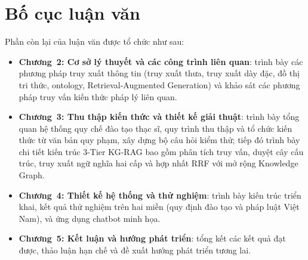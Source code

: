 \section{Bố cục luận văn}
\label{sec:bocuc}

Phần còn lại của luận văn được tổ chức như sau:
\begin{itemize}
    \item \textbf{Chương~2: Cơ sở lý thuyết và các công trình liên quan}: trình bày các phương pháp truy xuất thông tin (truy xuất thưa, truy xuất dày đặc, đồ thị tri thức, ontology, Retrieval-Augmented Generation) và khảo sát các phương pháp truy vấn kiến thức pháp lý liên quan.
    \item \textbf{Chương~3: Thu thập kiến thức và thiết kế giải thuật}: trình bày tổng quan hệ thống quy chế đào tạo thạc sĩ, quy trình thu thập và tổ chức kiến thức từ văn bản quy phạm, xây dựng bộ câu hỏi kiểm thử; tiếp đó trình bày chi tiết kiến trúc 3-Tier KG-RAG bao gồm phân tích truy vấn, duyệt cây cấu trúc, truy xuất ngữ nghĩa hai cấp và hợp nhất RRF với mở rộng Knowledge Graph.
    \item \textbf{Chương~4: Thiết kế hệ thống và thử nghiệm}: trình bày kiến trúc triển khai, kết quả thử nghiệm trên hai miền (quy định đào tạo và pháp luật Việt Nam), và ứng dụng chatbot minh họa.
    \item \textbf{Chương~5: Kết luận và hướng phát triển}: tổng kết các kết quả đạt được, thảo luận hạn chế và đề xuất hướng phát triển tương lai.
\end{itemize}
